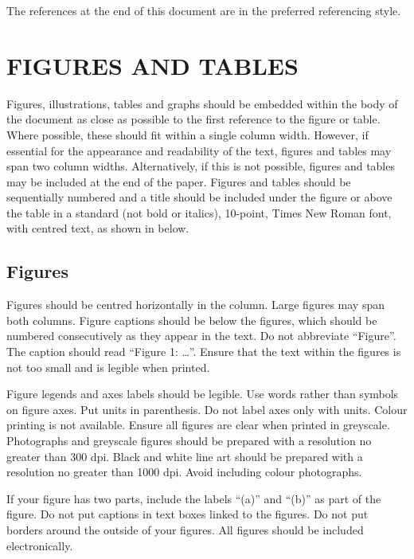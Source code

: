 \documentclass[10pt,twocolumn]{witseiepaper}
\begin{document}
The references at the end of this document are in the preferred referencing
style.


%
\section{FIGURES AND TABLES}

Figures, illustrations, tables and graphs should be embedded within the body of
the document as close as possible to the first reference to the figure or
table. Where possible, these should fit within a single column width.  However,
if essential for the appearance and readability of the text, figures and tables
may span two column widths. Alternatively, if this is not possible, figures and
tables may be included at the end of the paper.  Figures and tables should be
sequentially numbered and a title should be included under the figure or above
the table in a standard (not bold or italics), 10-point, Times New Roman font,
with centred text, as shown in  below.


\subsection{Figures}

Figures should be centred horizontally in the column.  Large figures may span
both columns. Figure captions should be below the figures, which should be
numbered consecutively as they appear in the text. Do not abbreviate ``Figure''.
The caption should read ``Figure 1: \ldots''. Ensure that the text within the
figures is not too small and is legible when printed.

Figure legends and axes labels should be legible. Use words rather than symbols
on figure axes. Put units in parenthesis. Do not label axes only with units.
Colour printing is not available. Ensure all figures are clear when printed in
greyscale. Photographs and greyscale figures should be prepared with a
resolution no greater than 300 dpi. Black and white line art should be prepared
with a resolution no greater than 1000 dpi. Avoid including colour photographs.

If your figure has two parts, include the labels ``(a)'' and ``(b)'' as part of
the figure. Do not put captions in text boxes linked to the figures. Do not put
borders around the outside of your figures. All figures should be included
electronically.
\end{document}
